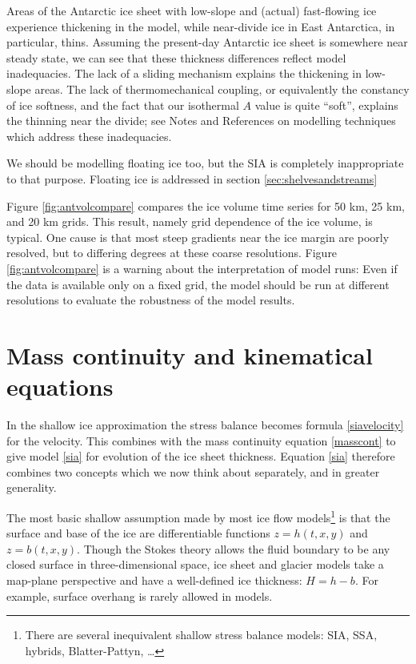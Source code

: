 \documentclass[letterpaper,final,12pt,reqno]{amsart}
\begin{document}
Areas of the Antarctic ice sheet with low-slope and (actual) fast-flowing ice experience thickening in the model, while near-divide ice in East Antarctica, in particular, thins.  Assuming the present-day Antarctic ice sheet is somewhere near steady state, we can see that these thickness differences reflect model inadequacies.  The lack of a sliding mechanism explains the thickening in low-slope areas.  The lack of thermomechanical coupling, or equivalently the constancy of ice softness, and the fact that our isothermal $A$ value is quite ``soft'', explains the thinning near the divide; see Notes and References on modelling techniques which address these inadequacies.

We should be modelling floating ice too, but the SIA is completely inappropriate to that purpose.  Floating ice is addressed in section \ref{sec:shelvesandstreams}

Figure \ref{fig:antvolcompare} compares the ice volume time series for 50 km, 25 km, and 20 km grids.  This result, namely grid dependence of the ice volume, is typical.  One cause is that most steep gradients near the ice margin are poorly resolved, but to differing degrees at these coarse resolutions.  Figure \ref{fig:antvolcompare} is a warning about the interpretation of model runs:  Even if the data is available only on a fixed grid, the model should be run at different resolutions to evaluate the robustness of the model results.


\section{Mass continuity and kinematical equations}   \label{sec:masscont}

In the shallow ice approximation the stress balance becomes formula \eqref{siavelocity} for the velocity.  This combines with the mass continuity equation \eqref{masscont} to give model \eqref{sia} for evolution of the ice sheet thickness.  Equation \eqref{sia} therefore combines two concepts which we now think about separately, and in greater generality.

The most basic shallow assumption made by most ice flow models\footnote{There are several inequivalent shallow stress balance models: SIA, SSA, hybrids, Blatter-Pattyn, \dots} is that the surface and base of the ice are differentiable functions $z=h(t,x,y)$ and $z=b(t,x,y)$.  Though the Stokes theory allows the fluid boundary to be any closed surface in three-dimensional space, ice sheet and glacier models take a map-plane perspective and have a well-defined ice thickness: $H=h-b$.  For example, surface overhang is rarely allowed in models.
\end{document}
